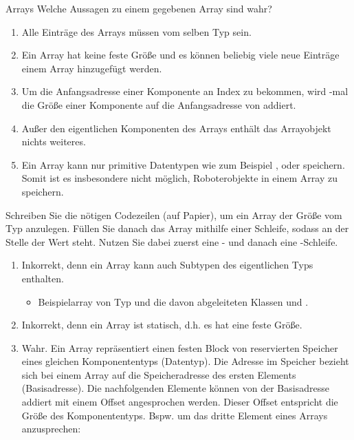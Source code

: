 \documentclass{../tuda-exercise}
\begin{document}
  \begin{task}[credit=\stars{1}{3}]{Arrays}
    Welche Aussagen zu einem gegebenen Array  sind wahr?

    \begin{enumerate}
      [label=(\arabic*)]
      \item Alle Einträge des Arrays müssen vom selben Typ sein.
      \item Ein Array hat keine feste Größe und es können beliebig viele neue Einträge einem
      Array hinzugefügt werden.
      \item Um die Anfangsadresse einer Komponente an Index  zu bekommen, wird
      -mal die Größe einer Komponente auf die Anfangsadresse von 
      addiert.
      \item Außer den eigentlichen Komponenten des Arrays enthält das Arrayobjekt nichts weiteres.
      \item Ein Array kann nur primitive Datentypen wie zum Beispiel ,
       oder  speichern. Somit ist es insbesondere nicht
      möglich, Roboterobjekte in einem Array zu speichern.
    \end{enumerate}

    Schreiben Sie die nötigen Codezeilen (auf Papier), um ein Array  der Größe
     vom Typ  anzulegen. Füllen Sie danach das Array mithilfe
    einer Schleife, sodass an der Stelle  der Wert  steht.
    Nutzen Sie dabei zuerst eine - und danach eine -Schleife.

    \begin{solution}
      \begin{enumerate}
        [label=(\arabic*)]
        \item Inkorrekt, denn ein Array kann auch Subtypen des eigentlichen Typs enthalten.
        \begin{itemize}
          \item Beispielarray von Typ  und die davon abgeleiteten Klassen
           und .

          
        \end{itemize}
        \item Inkorrekt, denn ein Array ist statisch, d.h. es hat eine feste Größe.
        \item Wahr. Ein Array repräsentiert einen festen Block von reservierten Speicher eines
        gleichen Komponententyps (Datentyp). Die Adresse im Speicher bezieht sich bei einem Array
        auf die Speicheradresse des ersten Elements (Basisadresse). Die nachfolgenden Elemente
        können von der Basisadresse addiert mit einem Offset angesprochen werden. Dieser Offset
        entspricht die Größe des Komponententyps. Bspw. um das dritte Element eines Arrays
        anzusprechen:


\end{enumerate}
\end{solution}
\end{task}
\end{document}
